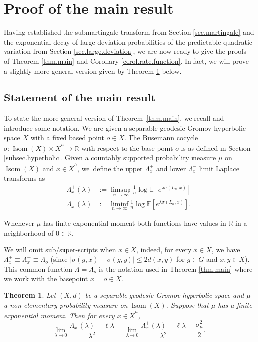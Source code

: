 \documentclass[10pt]{amsart}
\theoremstyle{plain}
\newtheorem{theorem}{Theorem}[section]
\theoremstyle{definition}
\newcommand\R{\mathbb{R}}
\DeclareMathOperator\Isom{Isom}
\begin{document}
\section{Proof of the main result}\label{sec.proof}
Having established the submartingale transform from Section \ref{sec.martingale} and the exponential decay of large deviation probabilities of the predictable quadratic variation from Section \ref{sec.large.deviation}, we are now ready to give the proofs of Theorem \ref{thm.main} and Corollary \ref{corol.rate.function}. In fact, we will prove a slightly more general version given by Theorem \ref{thm.main.tech} below.

\subsection{Statement of the main result}
To state the more general version of Theorem~\ref{thm.main}, we recall and introduce some notation. We are given a separable geodesic Gromov-hyperbolic space $X$ with a fixed based point $o \in X$. The Busemann cocycle $\sigma: \Isom(X) \times \overline{X}^h \to \R$ with respect to the base point $o$ is as defined in Section \ref{subsec.hyperbolic}. Given a countably supported probability measure $\mu$ on $\Isom(X)$ and $x \in \overline{X}^h$, we~define the upper $\Lambda_x^+$ and lower $\Lambda_x^-$ limit Laplace transforms as
\begin{align*}
\Lambda_x^+(\lambda)&:=\limsup_{n \to \infty} \frac{1}{n} \log \mathbb{E}[e^{\lambda\sigma(L_n,x)}]
\\
\tag*{and}
\Lambda_x^-(\lambda)&:=\liminf_{n \to \infty} \frac{1}{n} \log \mathbb{E}[e^{\lambda\sigma(L_n,x)}].
\end{align*}

Whenever $\mu$ has finite exponential moment both functions have values in $\R$ in a neighborhood of $0 \in \R$.

We will omit sub/super-scripts when $x\in X$, indeed, for every $x \in X$, we have $\Lambda_x^+ \equiv \Lambda_x^-\equiv \Lambda_o$ (since $|\sigma(g,x)-\sigma(g,y)|\leq 2 d(x,y)$ for $g\in G$ and $x,y\in X$). This common function $\Lambda=\Lambda_o$ is the notation used in Theorem \ref{thm.main} where we work with the basepoint $x=o \in X$.

\begin{theorem}\label{thm.main.tech}
Let $(X,d)$ be a separable geodesic Gromov-hyperbolic space and $\mu$ a non-elementary probability measure on $\Isom(X)$. Suppose that $\mu$ has a finite exponential moment. Then for every $x\in \overline{X}^h$,
\[
\lim_{\lambda \to 0} \frac{\Lambda_x^-(\lambda)-\ell \lambda }{\lambda^2}=
\lim_{\lambda \to 0} \frac{\Lambda_x^+(\lambda)-\ell \lambda }{\lambda^2}=\frac{\sigma^2_{\mu}}{2}.
\]
\end{theorem}
\end{document}
